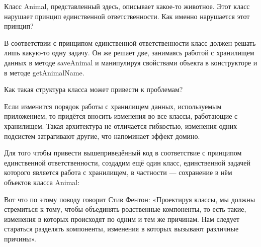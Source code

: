 \documentclass[a4paper]{article}
\begin{document}
Класс Animal, представленный здесь, описывает какое-то животное. Этот класс нарушает принцип единственной ответственности. Как именно нарушается этот принцип?

В соответствии с принципом единственной ответственности класс должен решать лишь какую-то одну задачу. Он же решает две, занимаясь работой с хранилищем данных в методе saveAnimal и манипулируя свойствами объекта в конструкторе и в методе getAnimalName.

Как такая структура класса может привести к проблемам?

Если изменится порядок работы с хранилищем данных, используемым приложением, то придётся вносить изменения во все классы, работающие с хранилищем. Такая архитектура не отличается гибкостью, изменения одних подсистем затрагивают другие, что напоминает эффект домино.

Для того чтобы привести вышеприведённый код в соответствие с принципом единственной ответственности, создадим ещё один класс, единственной задачей которого является работа с хранилищем, в частности — сохранение в нём объектов класса Animal:

\begin{figure}[h]
\end{figure}

Вот что по этому поводу говорит Стив Фентон: «Проектируя классы, мы должны стремиться к тому, чтобы объединять родственные компоненты, то есть такие, изменения в которых происходят по одним и тем же причинам. Нам следует стараться разделять компоненты, изменения в которых вызывают различные причины».
\end{document}
